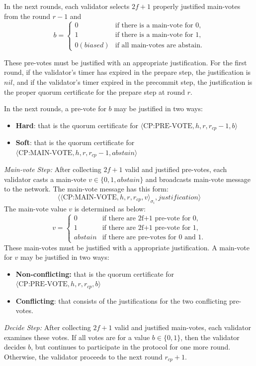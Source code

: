 \documentclass{novel}
\begin{document}
In the next rounds, each validator selects $2f+1$ properly justified main-votes from the round $r-1$ and
\begin{equation*}
  b = \begin{cases}
        0 & \text{if there is a main-vote for 0,} \\
        1 & \text{if there is a main-vote for 1,} \\
        0 (biased) & \text{if all main-votes are abstain.}
    \end{cases}
\end{equation*}

These pre-votes must be justified with an appropriate justification. For the first round, if the validator’s timer has expired in the prepare step, the justification is $nil$, and if the validator’s timer expired in the precommit step, the justification is the proper quorum certificate for the prepare step at round $r$.

In the next rounds, a pre-vote for $b$ may be justified in two ways:
\begin{itemize}
  \item \textbf{Hard}: that is the quorum certificate for $\langle \text{CP:PRE-VOTE},h,r,r_{cp}-1,b \rangle$
  \item \textbf{Soft}: that is the quorum certificate for $\langle \text{CP:MAIN-VOTE},h,r,r_{cp}-1,abstain \rangle$
\end{itemize}

\noindent \emph{Main-vote Step:} After collecting $2f+1$ valid and justified pre-votes, each validator casts a main-vote $v \in \{0, 1, abstain\}$ and broadcasts main-vote message to the network. The main-vote message has this form:
\begin{equation*}
  \langle\langle \text{CP:MAIN-VOTE},h,r,r_{cp},v \rangle_{\sigma_i}, justification\rangle
\end{equation*}
The main-vote value $v$ is determined as below:
\begin{equation*}
  v = \begin{cases}
    0 & \text{if there are 2f+1 pre-vote for 0,} \\
    1 & \text{if there are 2f+1 pre-vote for 1,} \\
    abstain & \text{if there are pre-votes for 0 and 1.}
    \end{cases}
\end{equation*}
These main-votes must be justified with a appropriate justification. A main-vote for $v$ may be justified in two ways:
\begin{itemize}
  \item \textbf{Non-conflicting:} that is the quorum certificate for $\langle \text{CP:PRE-VOTE},h,r,r_{cp},b \rangle$
  \item \textbf{Conflicting}: that consists of the justifications for the two conflicting pre-votes.
\end{itemize}
\noindent \emph{Decide Step:} After collecting $2f+1$ valid and justified main-votes, each validator examines these votes. If all votes are for a value $b \in \{0, 1\}$, then the validator decides $b$, but continues to participate in the protocol for one more round. Otherwise, the validator proceeds to the next round $r_{cp}+1$.
\end{document}
